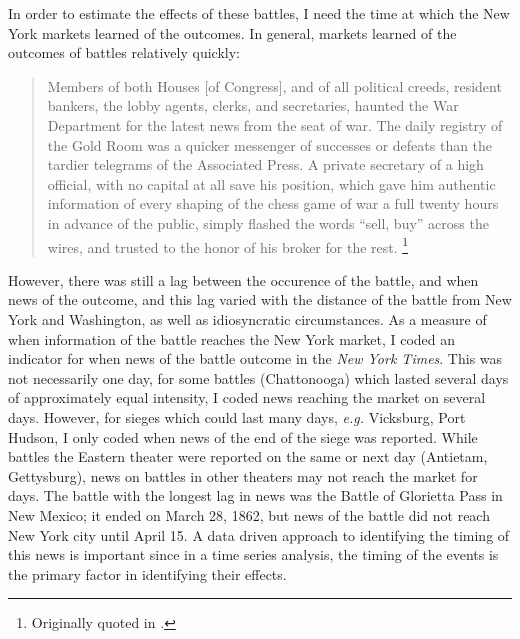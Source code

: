 In order to estimate the effects of these battles, I need the time at which the New York markets learned of the outcomes.
In general, markets learned of the outcomes of battles relatively quickly:
\begin{quote}
Members of both Houses [of Congress], and of all political creeds, resident bankers, the lobby agents, clerks, and secretaries, haunted the War Department for the latest news from the seat of war.
The daily registry of the Gold Room was a quicker messenger of successes or defeats than the tardier telegrams of the Associated Press. A private secretary of a high official, with no capital at all save his position, which gave him authentic information of every shaping of the chess game of war a full twenty hours in advance of the public, simply flashed the words ``sell, buy'' across the wires, and trusted to the honor of his broker for the rest. \parencite[245]{Medbery1870a}\footnote{Originally quoted in \textcite{WillardGuinnaneEtAl1996}.}
\end{quote}
However, there was still a lag between the occurence of the battle, and when news of the outcome, and this lag varied with the distance of the battle from New York and Washington, as well as idiosyncratic circumstances.
As a measure of when information of the battle reaches the New York market, I coded an indicator for when news of the battle outcome in the \textit{New York Times}.%
This was not necessarily one day, for some battles (Chattonooga) which lasted several days of approximately equal intensity, I coded news reaching the market on several days.
However, for sieges which could last many days, \textit{e.g.} Vicksburg, Port Hudson, I only coded when news of the end of the siege was reported.
While battles the Eastern theater were reported on the same or next day (Antietam, Gettysburg), news on battles in other theaters may not reach the market for days.
The battle with the longest lag in news was the Battle of Glorietta Pass in New Mexico; it ended on March 28, 1862, but news of the battle did not reach New York city until April 15.
A data driven approach to identifying the timing of this news is important since in a time series analysis, the timing of the events is the primary factor in identifying their effects.

